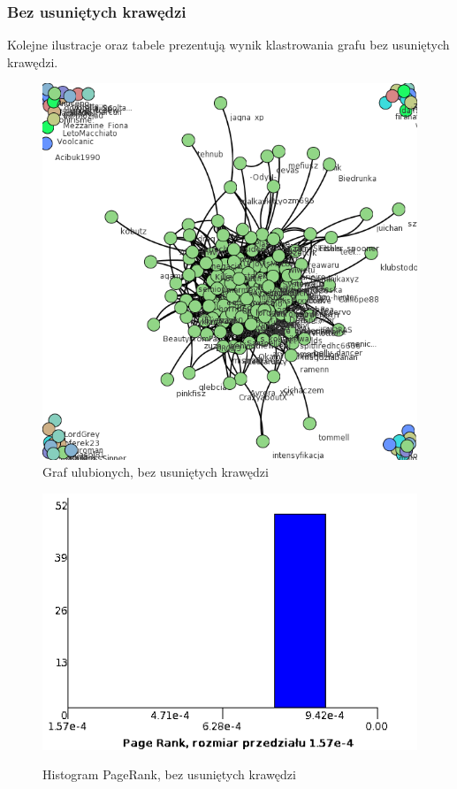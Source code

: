 \documentclass[10pt,a4paper]{article}
\begin{document}
\subsubsection {Bez usuniętych krawędzi}
  Kolejne ilustracje oraz tabele prezentują wynik klastrowania grafu bez usuniętych krawędzi.
\begin{figure}[H]
\centering
\caption{Graf ulubionych, bez usuniętych krawędzi}
\includegraphics[scale=0.5]{wyniki/final200Loved/0200loved.png}
\end{figure}

\begin{figure}[H]
\centering
\caption{Histogram PageRank, bez usuniętych krawędzi}
\includegraphics[scale=0.6]{wyniki/final200Loved/0200lovedPRHist.png}
\label{fig:1200lovedPRHist}
\end{figure}
\end{document}
